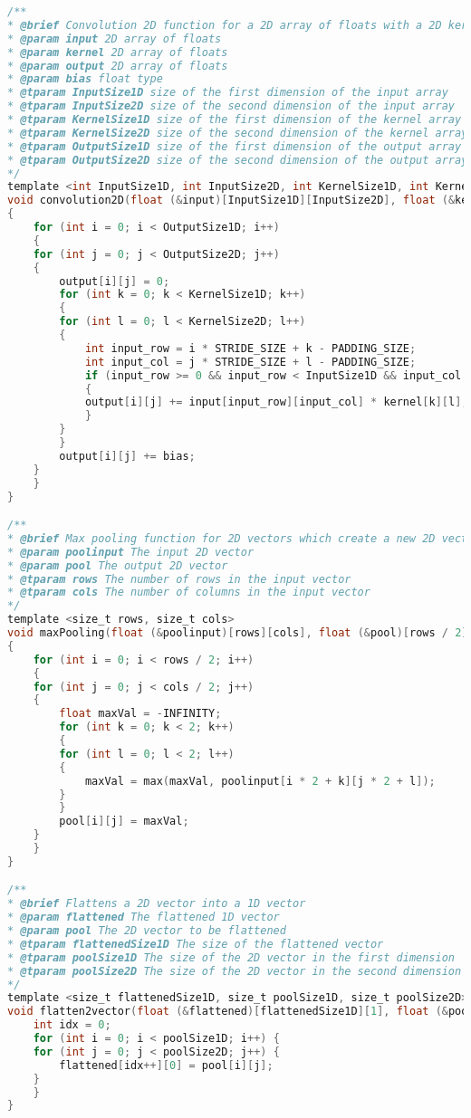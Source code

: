 \begin{lstlisting}[language=C, caption={Convolution functions}]
/**
* @brief Convolution 2D function for a 2D array of floats with a 2D kernel of floats and a bias of float type.
* @param input 2D array of floats
* @param kernel 2D array of floats
* @param output 2D array of floats
* @param bias float type
* @tparam InputSize1D size of the first dimension of the input array
* @tparam InputSize2D size of the second dimension of the input array
* @tparam KernelSize1D size of the first dimension of the kernel array
* @tparam KernelSize2D size of the second dimension of the kernel array
* @tparam OutputSize1D size of the first dimension of the output array
* @tparam OutputSize2D size of the second dimension of the output array
*/
template <int InputSize1D, int InputSize2D, int KernelSize1D, int KernelSize2D, int OutputSize1D, int OutputSize2D>
void convolution2D(float (&input)[InputSize1D][InputSize2D], float (&kernel)[KernelSize1D][KernelSize2D], float (&output)[OutputSize1D][OutputSize2D], float bias)
{
    for (int i = 0; i < OutputSize1D; i++)
    {
    for (int j = 0; j < OutputSize2D; j++)
    {
        output[i][j] = 0;
        for (int k = 0; k < KernelSize1D; k++)
        {
        for (int l = 0; l < KernelSize2D; l++)
        {
            int input_row = i * STRIDE_SIZE + k - PADDING_SIZE;
            int input_col = j * STRIDE_SIZE + l - PADDING_SIZE;
            if (input_row >= 0 && input_row < InputSize1D && input_col >= 0 && input_col < InputSize2D)
            {
            output[i][j] += input[input_row][input_col] * kernel[k][l];
            }
        }
        }
        output[i][j] += bias;
    }
    }
}

/**
* @brief Max pooling function for 2D vectors which create a new 2D vector with half the size of the input
* @param poolinput The input 2D vector
* @param pool The output 2D vector
* @tparam rows The number of rows in the input vector
* @tparam cols The number of columns in the input vector
*/
template <size_t rows, size_t cols>
void maxPooling(float (&poolinput)[rows][cols], float (&pool)[rows / 2][cols / 2])
{
    for (int i = 0; i < rows / 2; i++)
    {
    for (int j = 0; j < cols / 2; j++)
    {
        float maxVal = -INFINITY;
        for (int k = 0; k < 2; k++)
        {
        for (int l = 0; l < 2; l++)
        {
            maxVal = max(maxVal, poolinput[i * 2 + k][j * 2 + l]);
        }
        }
        pool[i][j] = maxVal;
    }
    }
}

/**
* @brief Flattens a 2D vector into a 1D vector
* @param flattened The flattened 1D vector
* @param pool The 2D vector to be flattened
* @tparam flattenedSize1D The size of the flattened vector
* @tparam poolSize1D The size of the 2D vector in the first dimension
* @tparam poolSize2D The size of the 2D vector in the second dimension
*/
template <size_t flattenedSize1D, size_t poolSize1D, size_t poolSize2D>
void flatten2vector(float (&flattened)[flattenedSize1D][1], float (&pool)[poolSize1D][poolSize2D]) {
    int idx = 0;
    for (int i = 0; i < poolSize1D; i++) {
    for (int j = 0; j < poolSize2D; j++) {
        flattened[idx++][0] = pool[i][j];
    }
    }
}


\end{lstlisting}
